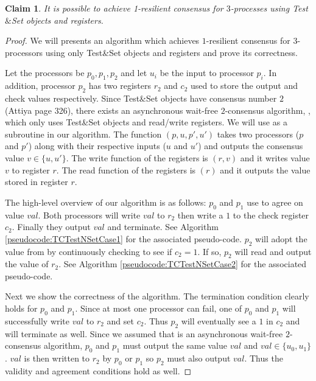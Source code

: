 \documentclass[11pt]{article}
\newtheorem{claim}[theorem]{Claim}
\begin{document}
\begin{claim}
It is possible to achieve 1-resilient consensus for $3$-processes using Test$\&$Set objects and registers. 
\end{claim}
\begin{proof}
We will presents an algorithm which achieves $1$-resilient consensus for $3$-processors using only Test\&Set objects and registers and prove its correctness. 

Let the processors be $p_0, p_1, p_2$ and let $u_i$ be the input to processor $p_i$. In addition, processor $p_2$ has two registers $r_2$ and $c_2$ used to store the output and check values respectively. Since Test\&Set objects have consensus number $2$ (Attiya page 326), there exists an asynchronous wait-free $2$-consensus algorithm, , which only uses Test\&Set objects and read/write registers. We will use  as a subroutine in our algorithm. The function $(p, u, p', u')$ takes two processors ($p$ and $p'$) along with their respective inputs ($u$ and $u'$) and outputs the consensus value $v \in \{u, u'\}$. The write function of the registers is $(r, v)$ and it writes value $v$ to register $r$. The read function of the registers is $(r)$ and it outputs the value stored in register $r$. 

The high-level overview of our algorithm is as follows: $p_0$ and $p_1$ use  to agree on value $val$. Both processors will write $val$ to $r_2$ then write a $1$ to the check register $c_2$. Finally they output $val$ and terminate. See Algorithm \ref{pseudocode:TCTestNSetCase1} for the associated pseudo-code. $p_2$ will adopt the value from  by continuously checking to see if $c_2 = 1$. If so, $p_2$ will read and output the value of $r_2$. See Algorithm \ref{pseudocode:TCTestNSetCase2} for the associated pseudo-code. 

Next we show the correctness of the algorithm. The termination condition clearly holds for $p_0$ and $p_1$. Since at most one processor can fail, one of $p_0$ and $p_1$ will successfully write $val$ to $r_2$ and set $c_2$. Thus $p_2$ will eventually see a $1$ in $c_2$ and will terminate as well. Since we assumed that  is an asynchronous wait-free $2$-consensus algorithm, $p_0$ and $p_1$ must output the same value $val$ and $val \in \{u_0, u_1\}$. $val$ is then written to $r_2$ by $p_0$ or $p_1$ so $p_2$ must also output $val$. Thus the validity and agreement conditions hold as well. 

\end{proof}
\end{document}

